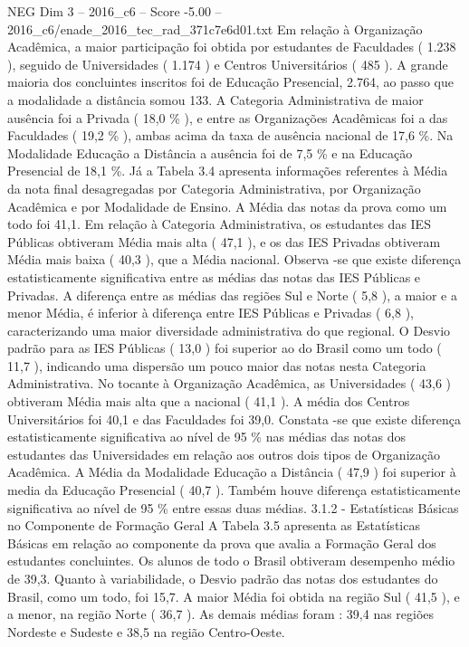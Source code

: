 \begin{textsample}{NEG Dim 3 – 2016\_c6 – Score -5.00 – 2016\_c6/enade\_2016\_tec\_rad\_371c7e6d01.txt}
Em relação à Organização Acadêmica, a maior participação foi obtida por estudantes de Faculdades ( 1.238 ), seguido de Universidades ( 1.174 ) e Centros Universitários ( 485 ).
A grande maioria dos concluintes inscritos foi de Educação Presencial, 2.764, ao passo que a modalidade a distância somou 133.
A Categoria Administrativa de maior ausência foi a Privada ( 18,0 \% ), e entre as Organizações Acadêmicas foi a das Faculdades ( 19,2 \% ), ambas acima da taxa de ausência nacional de 17,6 \%.
Na Modalidade Educação a Distância a ausência foi de 7,5 \% e na Educação Presencial de 18,1 \%.
Já a Tabela 3.4 apresenta informações referentes à Média da nota final desagregadas por Categoria Administrativa, por Organização Acadêmica e por Modalidade de Ensino.
A Média das notas da prova como um todo foi 41,1.
Em relação à Categoria Administrativa, os estudantes das IES Públicas obtiveram Média mais alta ( 47,1 ), e os das IES Privadas obtiveram Média mais baixa ( 40,3 ), que a Média nacional.
Observa -se que existe diferença estatisticamente significativa entre as médias das notas das IES Públicas e Privadas.
A diferença entre as médias das regiões Sul e Norte ( 5,8 ), a maior e a menor Média, é inferior à diferença entre IES Públicas e Privadas ( 6,8 ), caracterizando uma maior diversidade administrativa do que regional.
O Desvio padrão para as IES Públicas ( 13,0 ) foi superior ao do Brasil como um todo ( 11,7 ), indicando uma dispersão um pouco maior das notas nesta Categoria Administrativa.
No tocante à Organização Acadêmica, as Universidades ( 43,6 ) obtiveram Média mais alta que a nacional ( 41,1 ).
A média dos Centros Universitários foi 40,1 e das Faculdades foi 39,0.
Constata -se que existe diferença estatisticamente significativa ao nível de 95 \% nas médias das notas dos estudantes das Universidades em relação aos outros dois tipos de Organização Acadêmica.
A Média da Modalidade Educação a Distância ( 47,9 ) foi superior à media da Educação Presencial ( 40,7 ).
Também houve diferença estatisticamente significativa ao nível de 95 \% entre essas duas médias. 3.1.2 - Estatísticas Básicas no Componente de Formação Geral A Tabela 3.5 apresenta as Estatísticas Básicas em relação ao componente da prova que avalia a Formação Geral dos estudantes concluintes.
Os alunos de todo o Brasil obtiveram desempenho médio de 39,3.
Quanto à variabilidade, o Desvio padrão das notas dos estudantes do Brasil, como um todo, foi 15,7.
A maior Média foi obtida na região Sul ( 41,5 ), e a menor, na região Norte ( 36,7 ).
As demais médias foram : 39,4 nas regiões Nordeste e Sudeste e 38,5 na região Centro-Oeste.

\end{textsample}
